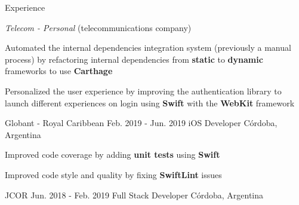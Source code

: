 \documentclass{curriculum}
\begin{document}
\begin{cvsection}{Experience}
\begin{sectionitemlist}
        \item{\textit{Telecom - Personal} (telecommunications company)}
            \begin{sectionitemlist}
            \item{
                Automated the internal dependencies integration system
                (previously a manual process) by refactoring internal dependencies
                from \textbf{static} to \textbf{dynamic} frameworks to use \textbf{Carthage}
            }
            \item{
                Personalized the user experience by improving the authentication
                library to launch different experiences on login using
                \textbf{Swift} with the \textbf{WebKit} framework
            }
            \end{sectionitemlist}

        \end{sectionitemlist}


    \makesectionitemheader
        {Globant - Royal Caribbean}                         {Feb. 2019 - Jun. 2019}
        {iOS Developer}                                         {Córdoba, Argentina}

        \begin{sectionitemlist}
        \item{Improved code coverage by adding \textbf{unit tests} using \textbf{Swift}}
        \item{Improved code style and quality by fixing \textbf{SwiftLint} issues}
        \end{sectionitemlist}


    \makesectionitemheader
        {JCOR}                                              {Jun. 2018 - Feb. 2019}
        {Full Stack Developer}                                 {Córdoba, Argentina}

        \begin{sectionitemlist}


\end{sectionitemlist}
\end{cvsection}
\end{document}
